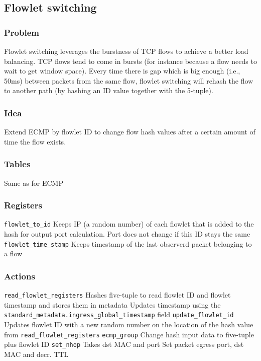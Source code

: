 \documentclass[a4paper, fontsize=8pt, landscape, DIV=1]{scrartcl}
\begin{document}
\begin{multicols*}{4}
  \vfill\null
  \columnbreak
  \subsection{Flowlet switching}
  \subsubsection{Problem} Flowlet switching leverages the burstness of TCP flows to achieve a better load balancing. 
  TCP flows tend to come in bursts (for instance because
  a flow needs to wait to get window space). Every time there is gap which is big enough (i.e., 50ms) 
  between packets from the same flow, flowlet switching
  will rehash the flow to another path (by hashing an ID value together with the 5-tuple).

  \subsubsection{Idea} Extend ECMP by flowlet ID to change flow hash values after
  a certain amount of time the flow exists.

  \subsubsection{Tables} 
  Same as for ECMP

  \subsubsection{Registers}
  \begin{outline}
  \1 \texttt{flowlet\_to\_id}
    \2 Keeps IP (a random number) of each flowlet that is added to the hash
    for output port calculation. Port does not change if this ID stays the same
  \1 \texttt{flowlet\_time\_stamp}
    \2 Keeps timestamp of the last observerd packet belonging to a flow
  \end{outline}

  \subsubsection{Actions}
  \begin{outline}
  \1 \texttt{read\_flowlet\_registers}
    \2 Hashes five-tuple to read flowlet ID and flowlet timestamp and stores them
    in metadata
    \2 Updates timestamp using the \texttt{standard\_metadata.ingress\_global\_timestamp} field
  \1 \texttt{update\_flowlet\_id}
    \2 Updates flowlet ID with a new random number on the location of the hash value from 
    \texttt{read\_flowlet\_registers}
  \1 \texttt{ecmp\_group}
    \2 Change hash input data to five-tuple plus flowlet ID
  \1 \texttt{set\_nhop} Takes dst MAC and port
    \2 Set packet egress port, dst MAC and decr. TTL
  \end{outline}


\end{multicols*}
\end{document}

